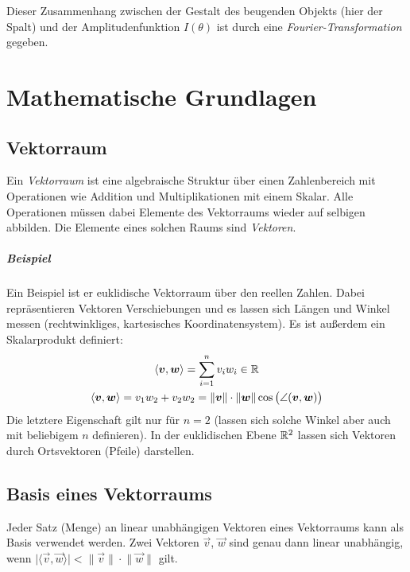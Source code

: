 	Dieser Zusammenhang zwischen der Gestalt des beugenden Objekts (hier der Spalt) und der Amplitudenfunktion \( I(\theta) \) ist durch eine \emph{Fourier-Transformation} gegeben.

	\section{Mathematische Grundlagen}
		\subsection{Vektorraum}
			Ein \emph{Vektorraum} ist eine algebraische Struktur über einen Zahlenbereich mit Operationen wie Addition und Multiplikationen mit einem Skalar. Alle Operationen müssen dabei Elemente des Vektorraums wieder auf selbigen abbilden. Die Elemente eines solchen Raums sind \emph{Vektoren}.

			\subparagraph{Beispiel}
				Ein Beispiel ist er euklidische Vektorraum über den reellen Zahlen. Dabei repräsentieren Vektoren Verschiebungen und es lassen sich Längen und Winkel messen (rechtwinkliges, kartesisches Koordinatensystem). Es ist außerdem ein Skalarprodukt definiert:
				\begin{gather*}
					\langle \bm{v}, \bm{w} \rangle = \sum_{i = 1}^{n} v_i w_i \in \mathbb{R} \\
					\langle \bm{v}, \bm{w} \rangle = v_1 w_2 + v_2 w_2 = \lVert \bm{v} \rVert \cdot \lVert \bm{w} \rVert \cos \big( \angle(\bm{v}, \bm{w}) \big)
				\end{gather*}
				Die letztere Eigenschaft gilt nur für \( n = 2 \) (\iA lassen sich solche Winkel aber auch mit beliebigem \(n\) definieren). In der euklidischen Ebene \( \mathbb{R}^2 \) lassen sich Vektoren durch Ortsvektoren (Pfeile) darstellen.

		\subsection{Basis eines Vektorraums}
			Jeder Satz (Menge) an linear unabhängigen Vektoren eines Vektorraums kann als Basis verwendet werden. Zwei Vektoren \(\vec{v}\), \(\vec{w}\) sind genau dann linear unabhängig, wenn \( \big\lvert \langle \vec{v}, \vec{w} \rangle \big\rvert < \lVert \vec{v} \rVert \cdot \lVert \vec{w} \rVert \) gilt.

